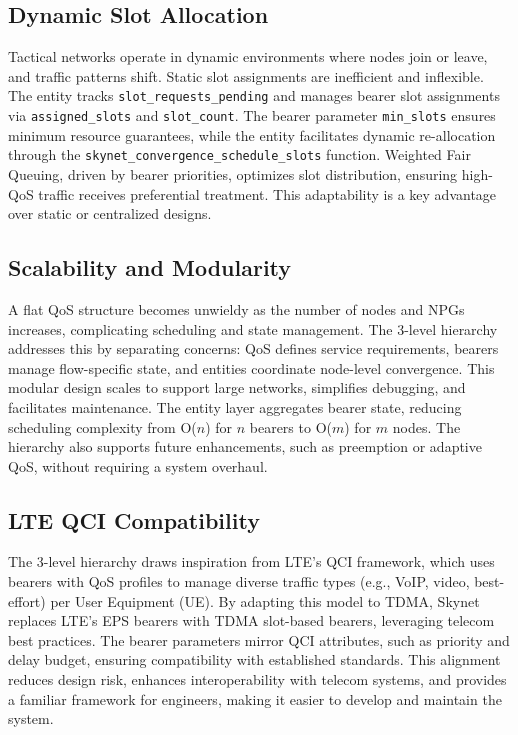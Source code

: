 \documentclass{article}
\begin{document}
\subsection{Dynamic Slot Allocation}
Tactical networks operate in dynamic environments where nodes join or leave, and traffic patterns
shift. Static slot assignments are inefficient and inflexible. The entity
tracks \texttt{slot\_requests\_pending} and manages bearer slot assignments via
\texttt{assigned\_slots} and \texttt{slot\_count}. The bearer parameter
\texttt{min\_slots} ensures minimum resource guarantees, while the entity facilitates dynamic
re-allocation through the \texttt{skynet\_convergence\_schedule\_slots} function. Weighted Fair
Queuing, driven by bearer priorities, optimizes slot distribution, ensuring high-QoS traffic
receives preferential treatment. This adaptability is a key advantage over static or centralized
designs.

\subsection{Scalability and Modularity}
A flat QoS structure becomes unwieldy as the number of nodes and NPGs increases, complicating
scheduling and state management. The 3-level hierarchy addresses this by separating concerns: QoS
defines service requirements, bearers manage flow-specific state, and entities coordinate node-level
convergence. This modular design scales to support large networks, simplifies debugging, and
facilitates maintenance. The entity layer aggregates bearer state, reducing scheduling complexity
from O($n$) for $n$ bearers to O($m$) for $m$ nodes. The hierarchy also supports future
enhancements, such as preemption or adaptive QoS, without requiring a system overhaul.

\subsection{LTE QCI Compatibility}
The 3-level hierarchy draws inspiration from LTE's QCI framework, which uses bearers with QoS
profiles to manage diverse traffic types (e.g., VoIP, video, best-effort) per User Equipment (UE).
By adapting this model to TDMA, Skynet replaces LTE's EPS bearers with TDMA slot-based bearers,
leveraging telecom best practices. The bearer parameters mirror QCI attributes,
such as priority and delay budget, ensuring compatibility with established standards. This alignment
reduces design risk, enhances interoperability with telecom systems, and provides a familiar
framework for engineers, making it easier to develop and maintain the system.
\end{document}

